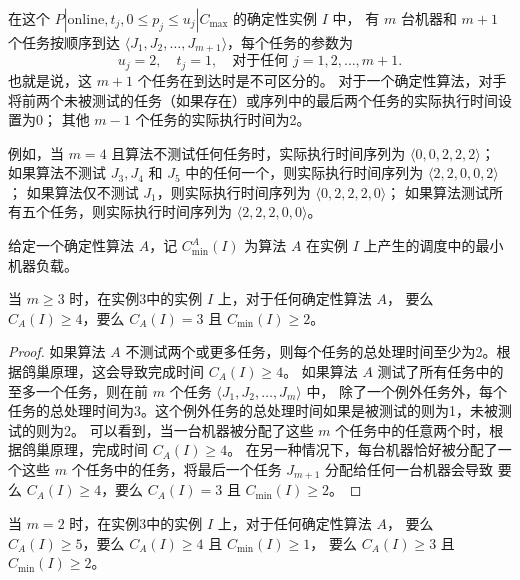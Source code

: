 \begin{exm}
    在这个 \( P | \text{online}, t_j, 0 \leq p_j \leq u_j | C_{\max} \) 的确定性实例 \( I \) 中，
    有 \( m \) 台机器和 \( m + 1 \) 个任务按顺序到达 \( \langle J_1, J_2, \ldots, J_{m+1} \rangle \)，每个任务的参数为
    \[ u_j = 2, \quad t_j = 1, \quad \text{对于任何 } j = 1, 2, \ldots, m + 1. \]
    也就是说，这 \( m + 1 \) 个任务在到达时是不可区分的。
    对于一个确定性算法，对手将前两个未被测试的任务（如果存在）或序列中的最后两个任务的实际执行时间设置为0；
    其他 \( m - 1 \) 个任务的实际执行时间为2。
    
    例如，当 \( m = 4 \) 且算法不测试任何任务时，实际执行时间序列为 \( \langle 0, 0, 2, 2, 2 \rangle \)；
    如果算法不测试 \( J_3, J_4 \) 和 \( J_5 \) 中的任何一个，则实际执行时间序列为 \( \langle 2, 2, 0, 0, 2 \rangle \)；
    如果算法仅不测试 \( J_1 \)，则实际执行时间序列为 \( \langle 0, 2, 2, 2, 0 \rangle \)；
    如果算法测试所有五个任务，则实际执行时间序列为 \( \langle 2, 2, 2, 0, 0 \rangle \)。
\end{exm}

给定一个确定性算法 \( A \)，记 \( C^A_{\min}(I) \) 为算法 \( A \) 在实例 \( I \) 上产生的调度中的最小机器负载。

\begin{lem}
    当 \( m \geq 3 \) 时，在实例3中的实例 \( I \) 上，对于任何确定性算法 \( A \)，
    要么 \( C_A(I) \geq 4 \)，要么 \( C_A(I) = 3 \) 且 \( C_{\min}(I) \geq 2 \)。
\end{lem}

\begin{proof}
    如果算法 \( A \) 不测试两个或更多任务，则每个任务的总处理时间至少为2。根据鸽巢原理，这会导致完成时间 \( C_A(I) \geq 4 \)。
    如果算法 \( A \) 测试了所有任务中的至多一个任务，则在前 \( m \) 个任务 \( \langle J_1, J_2, \ldots, J_m \rangle \) 中，
    除了一个例外任务外，每个任务的总处理时间为3。这个例外任务的总处理时间如果是被测试的则为1，未被测试的则为2。
    可以看到，当一台机器被分配了这些 \( m \) 个任务中的任意两个时，根据鸽巢原理，完成时间 \( C_A(I) \geq 4 \)。
    在另一种情况下，每台机器恰好被分配了一个这些 \( m \) 个任务中的任务，将最后一个任务 \( J_{m+1} \) 分配给任何一台机器会导致
    要么 \( C_A(I) \geq 4 \)，要么 \( C_A(I) = 3 \) 且 \( C_{\min}(I) \geq 2 \)。
\end{proof}

\begin{lem}
    当 \( m = 2 \) 时，在实例3中的实例 \( I \) 上，对于任何确定性算法 \( A \)，
    要么 \( C_A(I) \geq 5 \)，要么 \( C_A(I) \geq 4 \) 且 \( C_{\min}(I) \geq 1 \)，
    要么 \( C_A(I) \geq 3 \) 且 \( C_{\min}(I) \geq 2 \)。
\end{lem}

